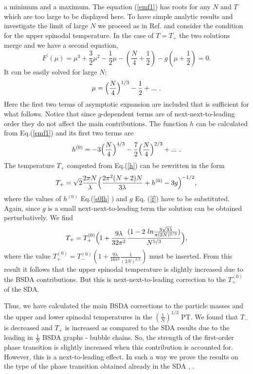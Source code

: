 \documentclass[a4paper,12pt]{article}
\begin{document}
a minimum and a maximum. The equation (\ref{emf1}) has roots for any
$N$ and $T$ which are too large to be displayed here. To have simple
analytic results and investigate the limit of large $N$ we proceed as
in Ref.\cite{pl} and consider the condition for the upper spinodal
temperature. In the case of $T = T_+$ the two solutions merge and we
have a second equation,
\begin{equation} \label{f'}
F^{'}(\mu) = \mu^3 + \frac{3}{2} \mu^2 - \frac{1}{2} \mu -
(\frac{N}{4} + \frac{1}{2}) - g( \mu + \frac{1}{2}) = 0. 
\end{equation}
It can be easily solved for large $N$: 
\begin{equation} \label{sol}
\mu = \Bigl(\frac{N}{4}\Bigr)^{1/3} - \frac{1}{2} + ...~.
\end{equation} 
Here the first two terms of asymptotic expansion are included that is
sufficient for what follows. Notice that since $g$-dependent terms are
of next-next-to-leading order they do not affect the main contributions.
The function $h$ can be calculated from Eq.(\ref{emf1}) and its first
two terms are
\begin{equation} \label{s0lh}
 h^{(0)} = - 3 \Bigl(\frac{N}{4}\Bigr)^{4/3} - \frac{7}{2} \Bigl( \frac{N}{4}\Bigr)^{2/3}  + ...~.
\end{equation}
The temperature $T_+$ computed from Eq.(\ref{h}) can be rewritten in
the form
\begin{equation} \label{t+}
T_+ = \sqrt{2} \frac{2\pi N}{\lambda} \Bigl( \frac{2 \pi^2 (N + 2)
  N}{3 \lambda } + h^{(0)} - 3 g \Bigr)^{- 1/2},
\end{equation}
where the values of $h^{(0)}$ Eq.(\ref{s0lh} ) and $g$ Eq. (\ref{f})
have to be substituted. Again, since $g$ is a small
next-next-to-leading term the solution can be obtained
perturbatively. We find
\begin{equation} \label{t+1}
T_+ = T_+^{(0)} \Bigl( 1 + \frac{9 \lambda}{32 \pi^2} \frac{ ( 1 - 2~
ln \frac{3 \sqrt{3\lambda} }{\pi (2N)^{2/3}})}{N^{5/3}}\Bigr) ,
\end{equation}
where the value $T_+^{(0)} = T_-^{(0)}( 1 + \frac{9 \lambda}{16 \pi^2}
\frac{1}{(2N)^{2/3}} )$ must be inserted. From this result it follows
that the upper spinodal temperature is slightly increased due to the
BSDA contributions. But this is next-next-to-leading correction to the
$T_+^{(0)}$ of the SDA.

Thus, we have calculated the main BSDA corrections to the particle
masses and the upper and lower spinodal temperatures in the
$(\frac{1}{N})^{1/3}$ PT. We found that $T_-$ is decreased and $T_+$
is increased as compared to the SDA results due to the leading in
$\frac{1}{N}$ BSDA graphs - bubble chains. So, the strength of the
first-order phase transition is slightly increased when this
contribution is accounted for. However, this is a next-to-leading
effect. In such a way we prove the results on the type of the phase
transition obtained already in the SDA \cite{prd}, \cite{pl}.
\end{document}
